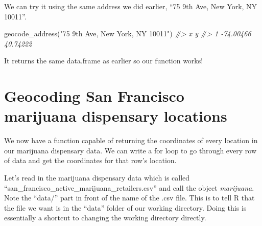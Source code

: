 \documentclass[
  12pt,
]{book}
\newenvironment{Shaded}{\begin{snugshade}}{\end{snugshade}}
\newcommand{\CommentTok}[1]{\textcolor[rgb]{0.37,0.37,0.37}{\textit{#1}}}
\newcommand{\FunctionTok}[1]{\textcolor[rgb]{0,0,0}{#1}}
\newcommand{\NormalTok}[1]{#1}
\newcommand{\StringTok}[1]{\textcolor[rgb]{0.5,0.5,0.5}{#1}}
\begin{document}
We can try it using the same address we did earlier, ``75 9th Ave, New York, NY 10011''.

\begin{Shaded}
\begin{Highlighting}[]
\FunctionTok{geocode\_address}\NormalTok{(}\StringTok{"75 9th Ave, New York, NY 10011"}\NormalTok{)}
\CommentTok{\#\textgreater{}           x        y}
\CommentTok{\#\textgreater{} 1 {-}74.00466 40.74222}
\end{Highlighting}
\end{Shaded}

It returns the same data.frame as earlier so our function works!

\hypertarget{geocoding-san-francisco-marijuana-dispensary-locations}{%
\section{Geocoding San Francisco marijuana dispensary locations}\label{geocoding-san-francisco-marijuana-dispensary-locations}}

We now have a function capable of returning the coordinates of every location in our marijuana dispensary data. We can write a for loop to go through every row of data and get the coordinates for that row's location.

Let's read in the marijuana dispensary data which is called ``san\_francisco\_active\_marijuana\_retailers.csv'' and call the object \emph{marijuana}. Note the ``data/'' part in front of the name of the .csv file. This is to tell R that the file we want is in the ``data'' folder of our working directory. Doing this is essentially a shortcut to changing the working directory directly.
\end{document}
